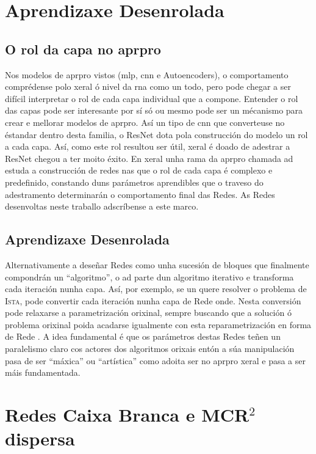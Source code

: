 \section{Aprendizaxe Desenrolada}
\label{sec:unrollopt}

\subsection{O rol da capa no \acrshort{aprpro}}

Nos modelos de \acrshort{aprpro} vistos (\acrshort{mlp}, \acrshort{cnn} e Autoencoders), o comportamento comprédense polo xeral ó nivel da \acrshort{rna} como un todo, pero pode chegar a ser difícil interpretar o rol de cada capa individual que a compone. Entender o rol das capas pode ser interesante por sí só ou mesmo pode ser un mécanismo para crear e mellorar modelos de \acrshort{aprpro}. Así un tipo de \acrshort{cnn} que converteuse no éstandar dentro desta familia, o ResNet \cite{resnet} dota pola construcción do modelo un rol a cada capa. Así, como este rol resultou ser útil, xeral é doado de adestrar a ResNet chegou a ter moito éxito. En xeral unha rama da \acrshort{aprpro} chamada \acrfull{ad} estuda a construcción de redes nas que o rol de cada capa é complexo e predefinido, constando duns parámetros aprendibles que o traveso do adestramento determinarán o comportamento final das Redes. As Redes desenvoltas neste traballo adscríbense a este marco.

\subsection{Aprendizaxe Desenrolada}

Alternativamente a deseñar Redes como unha sucesión de bloques que finalmente compondrán un ``algoritmo'', o \acrfull{ad} parte dun algoritmo iterativo e transforma cada iteración nunha capa. Así, por exemplo, se un quere resolver o problema de \textsc{Ista}, pode convertir cada iteración nunha capa de Rede onde. Nesta conversión pode relaxarse a parametrización orixinal, sempre buscando que a solución ó problema orixinal poida acadarse igualmente con esta reparametrización en forma de Rede \cite{algorithmUnrolling}. A idea fundamental é que os parámetros destas Redes teñen un paralelismo claro cos actores dos algoritmos orixais entón a súa manipulación pasa de ser ``máxica'' ou ``artística'' como adoita ser no \acrshort{aprpro} xeral e pasa a ser máis fundamentada.

\section{Redes Caixa Branca e \textsc{MCR}$^2$ dispersa}

